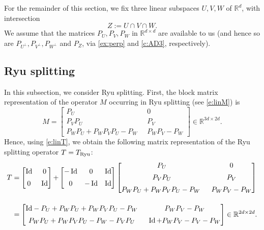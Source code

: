 \documentclass[11pt]{article}
\newcommand{\RR}{\ensuremath{\mathbb R}}
\newcommand{\Id}{\ensuremath{\operatorname{Id}}}
\newcommand{\tryu}{\ensuremath{T_{\text{\scriptsize Ryu}}}}
\theoremstyle{definition}
\providecommand{\RR}{\mathbb{R}}
\providecommand{\Id}{\operatorname{{ Id}}}
\providecommand{\Id}{\operatorname{Id}}
\providecommand{\RR}{\mathbb{R}}
\begin{document}
{For the remainder of this section, we fix 
three linear subspaces $U,V,W$ of $\RR^d$, with intersection 
\begin{equation*}
Z := U\cap V\cap W. 
\end{equation*}
We assume that the matrices $P_U,P_V,P_W$ in $\RR^{d\times d}$ are available to us
(and hence so are $P_{U^\perp},P_{V^\perp},P_{W^\perp}$ and $P_Z$,
via \cref{ex:perp} and \cref{c:AD3}, respectively). 


\subsection{Ryu splitting}

\label{ss:Ryublock}

In this subsection, we consider Ryu splitting.
First, 
the block matrix representation of the operator $M$ occurring 
in Ryu splitting (see \cref{e:linM}) is 
\begin{equation}
M = \begin{bmatrix}
P_U \;&  0 \\[0.5em]
P_VP_U \;& P_V\\[0.5em]
P_WP_U+P_WP_VP_U-P_W\;\; & P_WP_V-P_W
\end{bmatrix}\in\RR^{3d\times 2d}.
\label{e:RyuMmat}
\end{equation}
Hence, using \cref{e:linT}, 
we obtain the following matrix representation of the
Ryu splitting operator $T=\tryu$:
\begin{subequations}
\label{e:220525a}
\begin{align}
T &=\textcolor{black}{\begin{bmatrix}\Id\;&0\\[0.5em]0\;&\Id\end{bmatrix}+}
\begin{bmatrix}
-\Id & 0 &\Id \\[0.5em]
0 & -\Id & \Id
\end{bmatrix}
\begin{bmatrix}
P_U \;&  0 \\[0.5em]
P_VP_U \;& P_V\\[0.5em]
P_WP_U+P_WP_VP_U-P_W\;\; & P_WP_V-P_W
\end{bmatrix}\\[1em]
&= 
\begin{bmatrix}
\textcolor{black}{\Id}-P_U+P_WP_U+P_WP_VP_U-P_W &\;\; P_WP_V-P_W\\[0.5em]
P_WP_U+P_WP_VP_U-P_W-P_VP_U & \;\; \textcolor{black}{\Id+}P_WP_V-P_V-P_W
\end{bmatrix}\in\RR^{2d\times 2d}. 

\end{align}
\end{subequations}}
\end{document}
